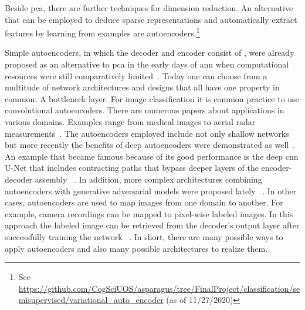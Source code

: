 Beside \acrshort{pca}, there are further techniques for dimension reduction. An alternative that can be employed to deduce sparse representations and automatically extract features by learning from examples are autoencoders.\footnote{See \url{https://github.com/CogSciUOS/asparagus/tree/FinalProject/classification/semisupervised/variational\_auto\_encoder} (as of 11/27/2020)}

\bigskip
Simple autoencoders, in which the decoder and encoder consist of , were already proposed as an alternative to \acrshort{pca} in the early days of \acrlong{ann} when computational resources were still comparatively limited~\citep{kramer1991nonlinear}. Today one can choose from a multitude of network architectures and designs that all have one property in common: A bottleneck layer. For image classification it is common practice to use convolutional autoencoders. There are numerous papers about applications in various domains. Examples range from medical images to aerial radar measurements~\citep{chen2017deep}. The autoencoders employed include not only shallow networks but more recently the benefits of deep autoencoders were demonstrated as well~\citep{geng2015high}. An example that became famous because of its good performance is the deep \acrshort{cnn} U-Net that includes contracting paths that bypass deeper layers of the encoder-decoder assembly ~\citep{ronneberger2015u}. In addition, more complex architectures combining autoencoders with generative adversarial models were proposed lately ~\citep{bao2017cvae}. In other cases, autoencoders are used to map images from one domain to another. For example, camera recordings can be mapped to pixel-wise labeled images. In this approach the labeled image can be retrieved from the decoder’s output layer after successfully training the network ~\citep{iglovikov2018ternausnet}. In short, there are many possible ways to apply autoencoders and also many possible architectures to realize them.


